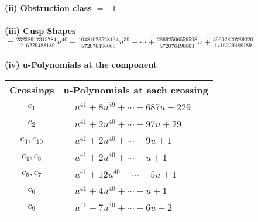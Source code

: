 \documentclass[1p]{elsarticle_modified}
\theoremstyle{definition}
\begin{document}
\flushleft \textbf{(ii) Obstruction class $= -1$}\\~\\
\flushleft \textbf{(iii) Cusp Shapes $= \frac{23238917313784}{1716229488189} u^{40}-\frac{10481023528134}{572076496063} u^{39}+\cdots+\frac{28692506559598}{572076496063} u+\frac{39302820789020}{1716229488189}$}\\~\\
\newpage\renewcommand{\arraystretch}{1}
\flushleft \textbf{(iv) u-Polynomials at the component}\newline \\
\begin{tabular}{m{50pt}|m{274pt}}
Crossings & \hspace{64pt}u-Polynomials at each crossing \\
\hline $$\begin{aligned}c_{1}\end{aligned}$$&$\begin{aligned}
&u^{41}+8 u^{39}+\cdots+687 u+229
\end{aligned}$\\
\hline $$\begin{aligned}c_{2}\end{aligned}$$&$\begin{aligned}
&u^{41}+2 u^{40}+\cdots-97 u+29
\end{aligned}$\\
\hline $$\begin{aligned}c_{3},c_{10}\end{aligned}$$&$\begin{aligned}
&u^{41}+2 u^{40}+\cdots+9 u+1
\end{aligned}$\\
\hline $$\begin{aligned}c_{4},c_{8}\end{aligned}$$&$\begin{aligned}
&u^{41}+2 u^{40}+\cdots- u+1
\end{aligned}$\\
\hline $$\begin{aligned}c_{5},c_{7}\end{aligned}$$&$\begin{aligned}
&u^{41}+12 u^{40}+\cdots+5 u+1
\end{aligned}$\\
\hline $$\begin{aligned}c_{6}\end{aligned}$$&$\begin{aligned}
&u^{41}+4 u^{40}+\cdots+u+1
\end{aligned}$\\
\hline $$\begin{aligned}c_{9}\end{aligned}$$&$\begin{aligned}
&u^{41}-7 u^{40}+\cdots+6 u-2
\end{aligned}$\\
\hline
\end{tabular}\\~\\
\end{document}
